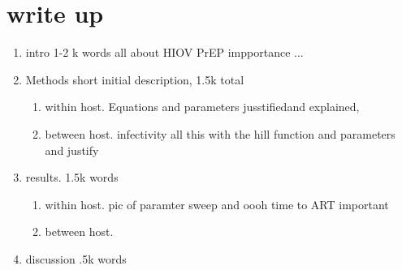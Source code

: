 \documentclass[DIV=15]{scrartcl}
\begin{document}
 
 
 \section*{write up}
 
\begin{enumerate}
\item intro 1-2 k words all about HIOV PrEP impportance ...
\item Methods short initial description, 1.5k total
\begin{enumerate}
\item within host. Equations and parameters jusstifiedand explained,

\item between host. infectivity all  this with the hill function and parameters and justify 



\end{enumerate}

\item results. 1.5k words
\begin{enumerate}
\item within host.  pic of paramter sweep and oooh time  to ART important 


\item between host. 

\end{enumerate}
\item discussion .5k words
\end{enumerate} 
 
 

 


 
\end{document}
